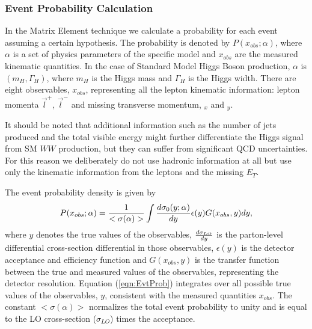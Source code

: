 \subsubsection{Event Probability Calculation}

In the Matrix Element technique we calculate a probability for each event assuming a
certain hypothesis.  The probability is denoted by $P(x_{obs};\alpha)$,
where $\alpha$ is a set of physics 
parameters of the specific model and $x_{obs}$ are the measured kinematic quantities.
In the case of Standard Model Higgs Boson production,
 $\alpha$ is $(m_H, \Gamma_H)$, where  $m_H$ is the Higgs mass 
and $\Gamma_H$ is the Higgs width. There are eight observables, $x_{obs}$, representing all the 
lepton kinematic information: lepton momenta $\vec{l}^+$, $\vec{l}^-$ and missing 
transverse momentum, \met$_x$ and \met$_y$.

It should be noted that additional information such as the number of jets
produced and the total visible energy might further differentiate the Higgs signal from SM
$WW$ production,
but they can suffer from significant  QCD uncertainties. For this reason we 
deliberately do not use hadronic information at all but use
only the kinematic information from the leptons and the missing $E_T$.

The event probability density is given by
\begin{equation}
P(x_{obs};\alpha) =
 {1 \over < \sigma(\alpha) > }
 \int \frac {d \sigma_{0} (y;\alpha) }{ dy }
 \epsilon (y) G(x_{obs},y) dy,  
\label{eqn:EvtProb}  
\end{equation}
where $y$ denotes the true values of the observables,
$d \sigma_{LO} \over  dy$ is the  parton-level differential cross-section differential
in those observables, $\epsilon(y)$ is the detector acceptance and efficiency function
and $G(x_{obs},y)$ is the transfer function between the true and measured values of the
observables, representing the detector resolution.
Equation (\ref{eqn:EvtProb}) integrates over all possible true values of the
observables, $y$, consistent with the measured quantities $x_{obs}$.
The constant $<\sigma(\alpha)>$ normalizes the total event probability to unity
and is equal to the LO cross-section ($\sigma_{LO}$) times the acceptance.

